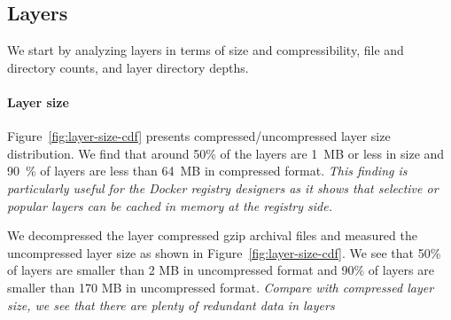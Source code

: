 \subsection{Layers}
\label{sec:layers}

We start by analyzing layers in terms of size and compressibility, file and
directory counts, and layer directory depths.

\paragraph{Layer size}



Figure~\ref{fig:layer-size-cdf} presents compressed/uncompressed layer size
distribution.
%
%
We find that around 50\% of the layers are 1~MB or less in size and 90~\% of layers are
less than 64~MB in compressed format.
%
%
\emph{This finding is particularly useful for the Docker registry designers as
it shows that selective or popular layers can be cached in memory at the
registry side.}

%


We decompressed the layer compressed gzip archival files and measured the
uncompressed layer size as shown in Figure~\ref{fig:layer-size-cdf}.
%
We see that 50\% of layers are smaller than 2 MB in uncompressed format and
90\% of layers are smaller than 170 MB in uncompressed format.
%
\emph{Compare with compressed layer size, we see that there are plenty of
redundant data in layers}



